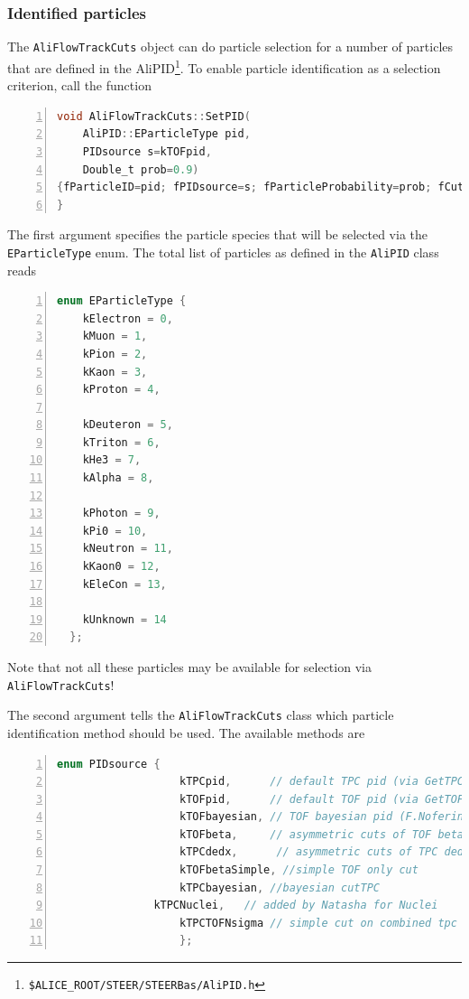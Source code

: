 \documentclass[a4paper]{book}
\numberwithin{equation}{subsection}
\begin{document}
\subsubsection{Identified particles}
The \texttt{AliFlowTrackCuts} object can do particle selection for a number of particles that are defined in the AliPID\footnote{\texttt{\$ALICE\_ROOT/STEER/STEERBas/AliPID.h}}. To enable 
particle identification as a selection criterion, call the function
\begin{lstlisting}[language=C, numbers=left]
void AliFlowTrackCuts::SetPID(
    AliPID::EParticleType pid, 
    PIDsource s=kTOFpid, 
    Double_t prob=0.9)
{fParticleID=pid; fPIDsource=s; fParticleProbability=prob; fCutPID=kTRUE; InitPIDcuts();
}\end{lstlisting}
The first argument specifies the particle species that will be selected via the \texttt{EParticleType} enum. The total list of particles as defined in the  \texttt{AliPID} class reads
\begin{lstlisting}[language=C, numbers=left]
  enum EParticleType {
    kElectron = 0, 
    kMuon = 1, 
    kPion = 2, 
    kKaon = 3, 
    kProton = 4, 

    kDeuteron = 5,
    kTriton = 6,
    kHe3 = 7,
    kAlpha = 8,
    
    kPhoton = 9,
    kPi0 = 10, 
    kNeutron = 11, 
    kKaon0 = 12, 
    kEleCon = 13,
    
    kUnknown = 14
  };\end{lstlisting}
  Note that not all these particles may be available for selection via \texttt{AliFlowTrackCuts}!
  
  The second argument tells the \texttt{AliFlowTrackCuts} class which particle identification method should be used. The available methods are
  \begin{lstlisting}[language=C, numbers=left]
    enum PIDsource {
                   kTPCpid,      // default TPC pid (via GetTPCpid)
                   kTOFpid,      // default TOF pid (via GetTOFpid)
                   kTOFbayesian, // TOF bayesian pid (F.Noferini)
                   kTOFbeta,     // asymmetric cuts of TOF beta signal
                   kTPCdedx,      // asymmetric cuts of TPC dedx signal
                   kTOFbetaSimple, //simple TOF only cut
                   kTPCbayesian, //bayesian cutTPC
	           kTPCNuclei,   // added by Natasha for Nuclei
                   kTPCTOFNsigma // simple cut on combined tpc tof nsigma
                   };\end{lstlisting}
                   
\end{document}
